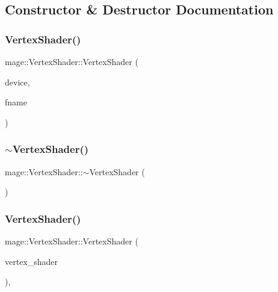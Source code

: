 \subsection{Constructor \& Destructor Documentation}
\hypertarget{classmage_1_1_vertex_shader_a5d18f4ce3028666915d0055de5ecfc88}{}\label{classmage_1_1_vertex_shader_a5d18f4ce3028666915d0055de5ecfc88} 
\subsubsection{\texorpdfstring{Vertex\+Shader()}{VertexShader()}\hspace{0.1cm}{\footnotesize\ttfamily [1/2]}}
{\footnotesize\ttfamily mage\+::\+Vertex\+Shader\+::\+Vertex\+Shader (\begin{DoxyParamCaption}\item[{I\+D3\+D11\+Device2 $\ast$}]{device,  }\item[{const wstring \&}]{fname }\end{DoxyParamCaption})}

\hypertarget{classmage_1_1_vertex_shader_aa475ad31613dd20fdcc4930409fd0cfd}{}\label{classmage_1_1_vertex_shader_aa475ad31613dd20fdcc4930409fd0cfd} 
\subsubsection{\texorpdfstring{$\sim$\+Vertex\+Shader()}{~VertexShader()}}
{\footnotesize\ttfamily mage\+::\+Vertex\+Shader\+::$\sim$\+Vertex\+Shader (\begin{DoxyParamCaption}{ }\end{DoxyParamCaption})\hspace{0.3cm}{\ttfamily [virtual]}}

\hypertarget{classmage_1_1_vertex_shader_a713f8581278ea2e5eb3010207b7e42a8}{}\label{classmage_1_1_vertex_shader_a713f8581278ea2e5eb3010207b7e42a8} 
\subsubsection{\texorpdfstring{Vertex\+Shader()}{VertexShader()}\hspace{0.1cm}{\footnotesize\ttfamily [2/2]}}
{\footnotesize\ttfamily mage\+::\+Vertex\+Shader\+::\+Vertex\+Shader (\begin{DoxyParamCaption}\item[{const \hyperlink{classmage_1_1_vertex_shader}{Vertex\+Shader} \&}]{vertex\+\_\+shader }\end{DoxyParamCaption})\hspace{0.3cm}{\ttfamily [private]}, {\ttfamily [delete]}}



